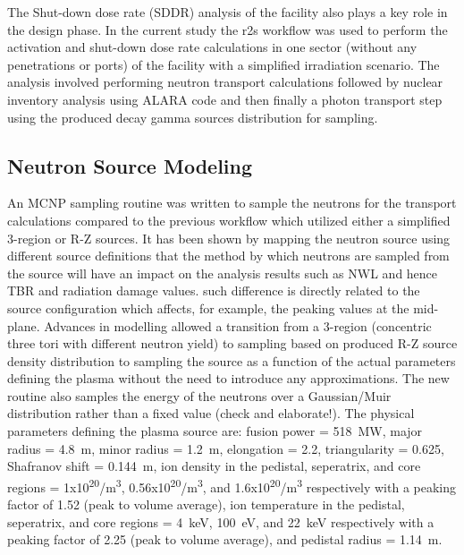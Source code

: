 \documentclass[12pt, letterpaper]{elsarticle}
\begin{document}
The Shut-down dose rate (SDDR) analysis of the facility also plays a key role in the design phase. In the current study the r2s \cite{ref_8, ref_9} workflow was used to perform the activation and shut-down dose rate calculations in one sector (without any penetrations or ports) of the facility with a simplified irradiation scenario. The analysis involved performing neutron transport calculations followed by nuclear inventory analysis using ALARA \cite{ref_10} code and then finally a photon transport step using the produced decay gamma sources distribution for sampling.   

\subsection{Neutron Source Modeling} \label{Neutron Source Modelling}
An MCNP sampling routine was written to sample the neutrons for the transport calculations compared to the previous workflow which utilized either a simplified 3-region or R-Z sources. It has been shown by mapping the neutron source using different source definitions that the method by which neutrons are sampled from the source will have an impact on the analysis results such as NWL and hence TBR and radiation damage values. such difference is directly related to the source configuration which affects, for example, the peaking values at the mid-plane. Advances in modelling allowed a transition from a 3-region (concentric three tori with different neutron yield) to sampling based on produced R-Z source density distribution to sampling the source as a function of the actual parameters defining the plasma without the need to introduce any approximations. The new routine also samples the energy of the neutrons over a Gaussian/Muir distribution rather than a fixed value (check and elaborate!). 
The physical parameters defining the plasma source \cite{ref_11} are: fusion power = \SI{518}{MW}, major radius = \SI{4.8}{m}, minor radius = \SI{1.2}{m}, elongation = 2.2, triangularity = 0.625, Shafranov shift = \SI{0.144}{m}, ion density in the pedistal, seperatrix, and core regions = 1x10\textsuperscript{20}/m\textsuperscript{3}, 0.56x10\textsuperscript{20}/m\textsuperscript{3}, and 1.6x10\textsuperscript{20}/m\textsuperscript{3} respectively with a peaking factor of 1.52 (peak to volume average), ion temperature in the pedistal, seperatrix, and core regions  = \SI{4}{keV}, \SI{100}{eV}, and \SI{22}{keV} respectively with a peaking factor of 2.25 (peak to volume average), and pedistal radius = \SI{1.14}{m}.
\end{document}

